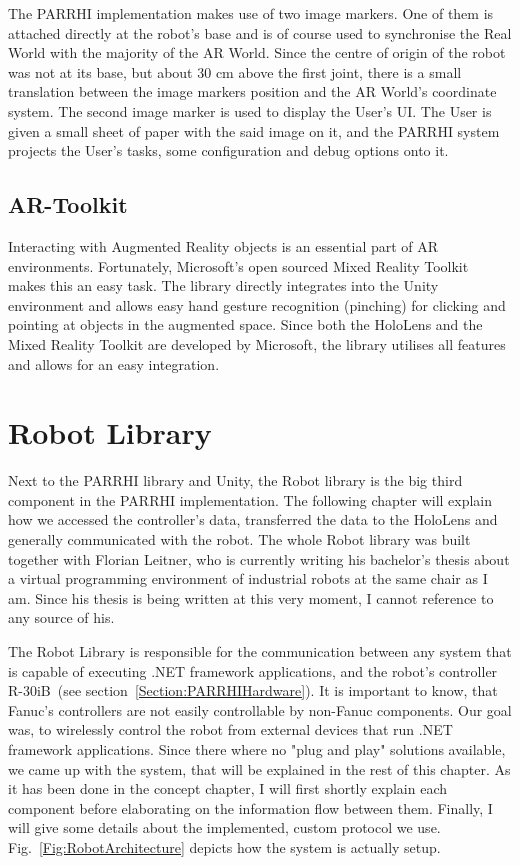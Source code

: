The PARRHI implementation makes use of two image markers. One of them is attached directly at the robot's base and is of course used to synchronise the Real World with the majority of the AR World. Since the centre of origin of the robot was not at its base, but about 30 cm above the first joint, there is a small translation between the image markers position and the AR World's coordinate system. The second image marker is used to display the User's UI. The User is given a small sheet of paper with the said image on it, and the PARRHI system projects the User's tasks, some configuration and debug options onto it.


\subsection{AR-Toolkit}
Interacting with Augmented Reality objects is an essential part of AR environments. Fortunately, Microsoft's open sourced Mixed Reality Toolkit~\cite{MicrosoftMRToolkit} makes this an easy task. The library directly integrates into the Unity environment and allows easy hand gesture recognition (pinching) for clicking and pointing at objects in the augmented space. Since both the HoloLens and the Mixed Reality Toolkit are developed by Microsoft, the library utilises all features and allows for an easy integration.


\section{Robot Library}
Next to the PARRHI library and Unity, the Robot library is the big third component in the PARRHI implementation. The following chapter will explain how we accessed the controller's data, transferred the data to the HoloLens and generally communicated with the robot. The whole Robot library was built together with Florian Leitner, who is currently writing his bachelor's thesis about a virtual programming environment of industrial robots at the same chair as I am. Since his thesis is being written at this very moment, I cannot reference to any source of his.

The Robot Library is responsible for the communication between any system that is capable of executing .NET framework applications, and the robot's controller R-30iB~(see section~\ref{Section:PARRHIHardware}). It is important to know, that Fanuc's controllers are not easily controllable by non-Fanuc components. Our goal was, to wirelessly control the robot from external devices that run .NET framework applications. Since there where no "plug and play" solutions available, we came up with the system, that will be explained in the rest of this chapter. As it has been done in the concept chapter, I will first shortly explain each component before elaborating on the information flow between them. Finally, I will give some details about the implemented, custom protocol we use. Fig.~\ref{Fig:RobotArchitecture} depicts how the system is actually setup.

